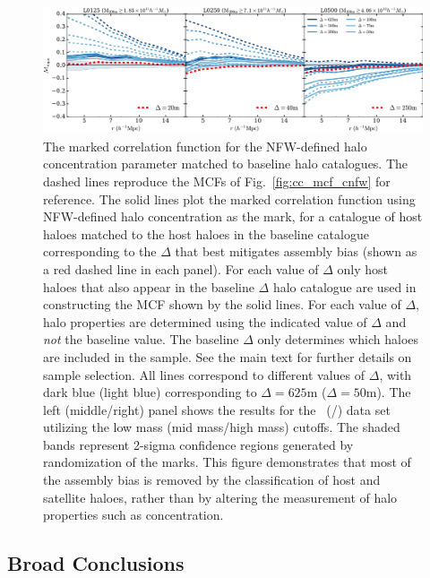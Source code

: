 \documentclass[usenatbib,fleqn]{mnras}
\begin{document}
\begin{figure}
	\centering
	\includegraphics[width=\textwidth]{match_mcf_cNFW.pdf}
	\caption{The marked correlation function for the NFW-defined halo concentration parameter matched to baseline halo catalogues. The dashed lines reproduce the MCFs of Fig.~\ref{fig:cc_mcf_cnfw} for reference. The solid lines plot the marked correlation function using NFW-defined halo concentration as the mark, for a catalogue of host haloes matched to the host haloes in the baseline catalogue corresponding to the $\Delta$ that best mitigates assembly bias (shown as a red dashed line in each panel). For each value of $\Delta$ only host haloes that also appear in the baseline $\Delta$ halo catalogue are used in constructing the MCF shown by the solid lines. For each value of $\Delta$, halo properties are determined using the indicated value of $\Delta$ and {\em not} the baseline value. The baseline $\Delta$ only determines which haloes are included in the sample. See the main text for further details on sample selection. All lines correspond to different values of $\Delta$, with dark blue (light blue) corresponding to $\Delta = 625$m ($\Delta = 50$m). The left (middle/right) panel shows the results for the \simA \ (\simB /\simC) data set utilizing the low mass (mid mass/high mass) cutoffs. The shaded bands represent 2-sigma confidence regions generated by randomization of the marks. This figure demonstrates that most of the assembly bias is removed by the classification of host and satellite haloes, rather than by altering the measurement of halo properties such as concentration. 
\label{fig:hvm_mcf_cnfw}
}
\end{figure}


\subsection{Broad Conclusions}
\end{document}
